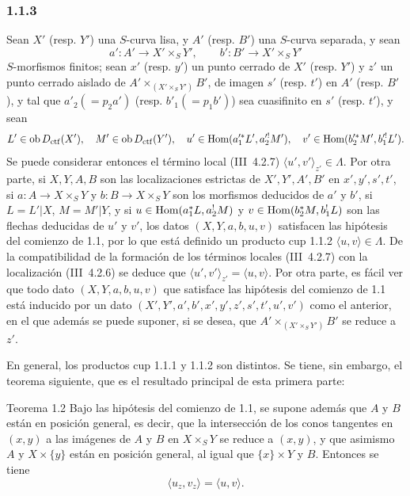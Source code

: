 \subsubsection*{1.1.3}
Sean $X'$ (resp. $Y'$) una $S$-curva lisa, y $A'$ (resp. $B'$) una $S$-curva separada, y sean
\[
a':A'\longrightarrow X'\times_S Y',
\qquad
b':B'\longrightarrow X'\times_S Y'
\]
$S$-morfismos finitos; sean $x'$ (resp. $y'$) un punto cerrado de $X'$ (resp. $Y'$) y $z'$ un punto cerrado aislado de $A'\times_{(X'\times_S Y')}B'$, de imagen $s'$ (resp. $t'$) en $A'$ (resp. $B'$), y tal que $a'_2(=p_2a')$ (resp. $b'_1(=p_1b')$) sea cuasifinito en $s'$ (resp. $t'$), y sean
\[
L'\in\operatorname{ob} D_{\mathrm{ctf}}(X'),\quad M'\in\operatorname{ob} D_{\mathrm{ctf}}(Y'),\quad
u'\in\operatorname{Hom}(a_1'^*L',a_2'^!M'),\quad v'\in\operatorname{Hom}(b_2'^*M',b_1'^!L').
\]
Se puede considerar entonces el término local (III~4.2.7) $\langle u',v'\rangle_{z'}\in\Lambda$. Por otra parte, si $X,Y,A,B$ son las localizaciones estrictas de $X',Y',A',B'$ en $x',y',s',t'$, si $a:A\to X\times_S Y$ y $b:B\to X\times_SY$ son los morfismos deducidos de $a'$ y $b'$, si $L=L'|X$, $M=M'|Y$, y si $u\in\operatorname{Hom}(a_1^*L,a_2^!M)$ y $v\in\operatorname{Hom}(b_2^*M,b_1^!L)$ son las flechas deducidas de $u'$ y $v'$, los datos $(X,Y,a,b,u,v)$ satisfacen las hipótesis del comienzo de 1.1, por lo que está definido un producto cup 1.1.2 $\langle u,v\rangle\in\Lambda$. De la compatibilidad de la formación de los términos locales (III~4.2.7) con la localización (III~4.2.6) se deduce que $\langle u',v'\rangle_{z'}=\langle u,v\rangle$. Por otra parte, es fácil ver que todo dato $(X,Y,a,b,u,v)$ que satisface las hipótesis del comienzo de 1.1 está inducido por un dato $(X',Y',a',b',x',y',z',s',t',u',v')$ como el anterior, en el que además se puede suponer, si se desea, que $A'\times_{(X'\times_S Y')}B'$ se reduce a $z'$.

En general, los productos cup 1.1.1 y 1.1.2 son distintos. Se tiene, sin embargo, el teorema siguiente, que es el resultado principal de esta primera parte:

\begin{statement}{Teorema 1.2}
Bajo las hipótesis del comienzo de 1.1, se supone además que $A$ y $B$ están en posición general, es decir, que la intersección de los conos tangentes en $(x,y)$ a las imágenes de $A$ y $B$ en $X\times_S Y$ se reduce a $(x,y)$, y que asimismo $A$ y $X\times\{y\}$ están en posición general, al igual que $\{x\}\times Y$ y $B$. Entonces se tiene
\begin{equation}\tag{1.2.1}
\langle u_z,v_z\rangle=\langle u,v\rangle.
\end{equation}
\end{statement}

